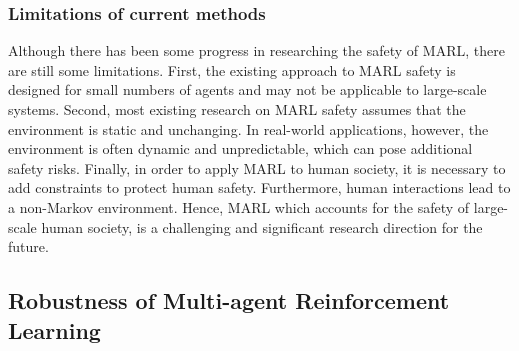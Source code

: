 \documentclass[acmsmall]{acmart}
\begin{document}
\subsubsection{Limitations of current methods}
Although there has been some progress in researching the safety of MARL, there are still some limitations. First, the existing approach to MARL safety is designed for small numbers of agents and may not be applicable to large-scale systems. Second, most existing research on MARL safety assumes that the environment is static and unchanging. In real-world applications, however, the environment is often dynamic and unpredictable, which can pose additional safety risks. Finally, in order to apply MARL to human society, it is necessary to add constraints to protect human safety. Furthermore, human interactions lead to a non-Markov environment. Hence, MARL which accounts for the safety of large-scale human society, is a challenging and significant research direction for the future.

\subsection{Robustness of Multi-agent Reinforcement Learning}
\end{document}
